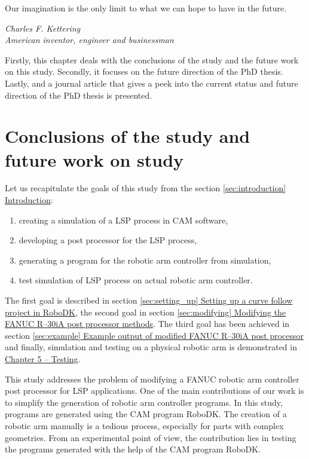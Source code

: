 \label{chap:discussion}



\epigraph{Our imagination is the only limit to what we can hope to have in the future.}{\textit{Charles F. Kettering \\ American inventor, engineer and businessman }}

Firstly, this chapter deals with the conclusions of the study and the future work on this study. Secondly, it focuses on the future direction of the PhD thesis. Lastly, and a journal article that gives a peek into the current status and future direction of the PhD thesis is presented.

\section{Conclusions of the study and future work on study}

Let us recapitulate the goals of this study from the section \hyperref[sec:introduction]{\ref{sec:introduction} Introduction}:

\begin{enumerate}

    \item creating a simulation of a LSP process in CAM software,
    \item developing a post processor for the LSP process, 
    \item generating a program  for the robotic arm controller from simulation,
    \item test simulation of LSP process on actual robotic arm controller.
    
\end{enumerate}

The first goal is described in section  \hyperref[sec:setting_up]{\ref{sec:setting_up} Setting up a curve follow project in RoboDK}, the second goal in section  \hyperref[sec:modifying]{\ref{sec:modifying} Modifying the FANUC R--30iA post processor methods}. The third goal has been achieved in section  \hyperref[sec:example]{\ref{sec:example} Example output of modified FANUC R–30iA post processor} and finally, simulation and testing on a physical robotic arm is demonstrated in \hyperref[chap:testing]{Chapter 5 -- Testing}.

This study addresses the problem of modifying a FANUC robotic arm controller post processor for LSP applications. One of the main contributions of our work is to simplify the generation of robotic arm controller programs. In this study, programs are generated using the CAM  program RoboDK. The creation of a robotic arm manually is a tedious process, especially for parts with complex geometries. From an experimental point of view, the contribution lies in testing the programs generated with the help of the CAM program RoboDK.

